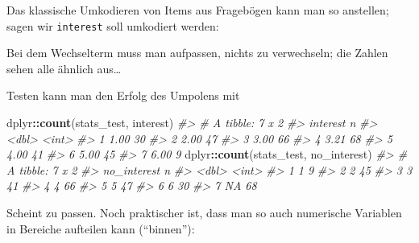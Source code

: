 \documentclass[12pt,ngerman,]{book}
\makeatletter
\newenvironment{Shaded}{\begin{snugshade}}{\end{snugshade}}
\newcommand{\KeywordTok}[1]{\textcolor[rgb]{0.13,0.29,0.53}{\textbf{#1}}}
\newcommand{\StringTok}[1]{\textcolor[rgb]{0.31,0.60,0.02}{#1}}
\newcommand{\CommentTok}[1]{\textcolor[rgb]{0.56,0.35,0.01}{\textit{#1}}}
\newcommand{\OperatorTok}[1]{\textcolor[rgb]{0.81,0.36,0.00}{\textbf{#1}}}
\newcommand{\NormalTok}[1]{#1}
\newenvironment{kframe}{%
\medskip{}
\setlength{\fboxsep}{.8em}
 \def\at@end@of@kframe{}%
 \ifinner\ifhmode%
  \def\at@end@of@kframe{\end{minipage}}%
  \begin{minipage}{\columnwidth}%
 \fi\fi%
 \def\FrameCommand##1{\hskip\@totalleftmargin \hskip-\fboxsep
 \colorbox{shadecolor}{##1}\hskip-\fboxsep
     \hskip-\linewidth \hskip-\@totalleftmargin \hskip\columnwidth}%
 \MakeFramed {\advance\hsize-\width
   \@totalleftmargin\z@ \linewidth\hsize
   \@setminipage}}%
 {\par\unskip\endMakeFramed%
 \at@end@of@kframe}
\renewenvironment{Shaded}{\begin{kframe}}{\end{kframe}}
\theoremstyle{definition}
\theoremstyle{definition}
\theoremstyle{remark}
\makeatother
\begin{document}
Das klassische Umkodieren von Items aus Fragebögen kann man so
anstellen; sagen wir \texttt{interest} soll umkodiert werden:

\begin{Shaded}
\end{Shaded}

Bei dem Wechselterm muss man aufpassen, nichts zu verwechseln; die
Zahlen sehen alle ähnlich aus\ldots{}

Testen kann man den Erfolg des Umpolens mit

\begin{Shaded}
\begin{Highlighting}[]
\NormalTok{dplyr}\OperatorTok{::}\KeywordTok{count}\NormalTok{(stats_test, interest)}
\CommentTok{#> # A tibble: 7 x 2}
\CommentTok{#>   interest     n}
\CommentTok{#>      <dbl> <int>}
\CommentTok{#> 1     1.00    30}
\CommentTok{#> 2     2.00    47}
\CommentTok{#> 3     3.00    66}
\CommentTok{#> 4     3.21    68}
\CommentTok{#> 5     4.00    41}
\CommentTok{#> 6     5.00    45}
\CommentTok{#> 7     6.00     9}
\NormalTok{dplyr}\OperatorTok{::}\KeywordTok{count}\NormalTok{(stats_test, no_interest)}
\CommentTok{#> # A tibble: 7 x 2}
\CommentTok{#>   no_interest     n}
\CommentTok{#>         <dbl> <int>}
\CommentTok{#> 1           1     9}
\CommentTok{#> 2           2    45}
\CommentTok{#> 3           3    41}
\CommentTok{#> 4           4    66}
\CommentTok{#> 5           5    47}
\CommentTok{#> 6           6    30}
\CommentTok{#> 7          NA    68}
\end{Highlighting}
\end{Shaded}

Scheint zu passen. Noch praktischer ist, dass man so auch numerische
Variablen in Bereiche aufteilen kann (``binnen''):

\begin{Shaded}
\end{Shaded}
\end{document}
